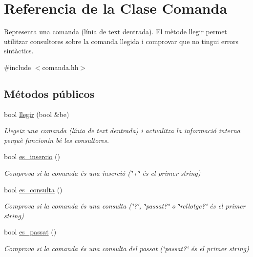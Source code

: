 \hypertarget{class_comanda}{}\section{Referencia de la Clase Comanda}
\label{class_comanda}


Representa una comanda (línia de text d\textquotesingle{}entrada). El mètode llegir permet utilitzar consultores sobre la comanda llegida i comprovar que no tingui errors sintàctics.  




{\ttfamily \#include $<$comanda.\+hh$>$}

\subsection*{Métodos públicos}
\begin{DoxyCompactItemize}
\item 
bool \hyperlink{class_comanda_af2dbc8ccdbb94bed6ea26155edc71b57}{llegir} (bool \&be)
\begin{DoxyCompactList}\small\item\em Llegeix una comanda (línia de text d\textquotesingle{}entrada) i actualitza la informació interna perquè funcionin bé les consultores. \end{DoxyCompactList}\item 
bool \hyperlink{class_comanda_a614467bedacc9cf29cc5a9dcbba6b23d}{es\+\_\+insercio} ()
\begin{DoxyCompactList}\small\item\em Comprova si la comanda és una inserció (\char`\"{}+\char`\"{} és el primer string) \end{DoxyCompactList}\item 
bool \hyperlink{class_comanda_a847ee227fd7fea3a105dbd78735de453}{es\+\_\+consulta} ()
\begin{DoxyCompactList}\small\item\em Comprova si la comanda és una consulta (\char`\"{}?\char`\"{}, \char`\"{}passat?\char`\"{} o \char`\"{}rellotge?\char`\"{} és el primer string) \end{DoxyCompactList}\item 
bool \hyperlink{class_comanda_a1f435f8b605f0d1f5cbb06c8c6fe4005}{es\+\_\+passat} ()
\begin{DoxyCompactList}\small\item\em Comprova si la comanda és una consulta del passat (\char`\"{}passat?\char`\"{} és el primer string) \end{DoxyCompactList}\item 

\end{DoxyCompactItemize}
